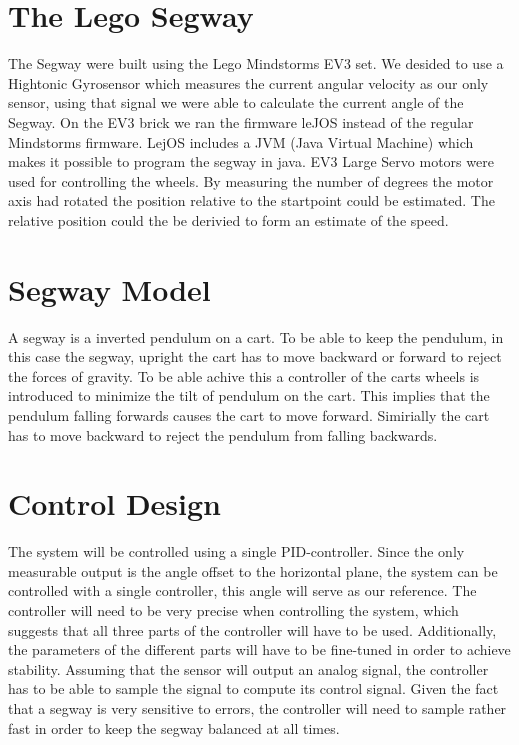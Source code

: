  \section{The Lego Segway}
 The Segway were built using the Lego Mindstorms EV3 set. We desided to use a Hightonic Gyrosensor which measures the current angular velocity as our only sensor, using that signal we were able to calculate the current angle of the Segway. On the EV3 brick we ran the firmware leJOS instead of the regular Mindstorms firmware. LejOS includes a JVM (Java Virtual Machine) which makes it possible to program the segway in java. EV3 Large Servo motors were used for controlling the wheels. By measuring the number of degrees the motor axis had rotated the position relative to the startpoint could be estimated. The relative position could the be derivied to form an estimate of the speed. 

\section{Segway Model}
A segway is a inverted pendulum on a cart. To be able to keep the pendulum, in this case the segway, upright the cart has to move backward or forward to reject the forces of gravity. To be able achive this a controller of the carts wheels is introduced to minimize the tilt of pendulum on the cart. This implies that the pendulum falling forwards causes the cart to move forward. Simirially the cart has to move backward to reject the pendulum from falling backwards. 

\section{Control Design}

The system will be controlled using a single PID-controller. Since the only measurable output is the angle offset to the horizontal plane, the system can be controlled with a single controller, this angle will serve as our reference. The controller will need to be very precise when controlling the system, which suggests that all three parts of the controller will have to be used. Additionally, the parameters of the different parts will have to be fine-tuned in order to achieve stability.
    Assuming that the sensor will output an analog signal, the controller has to be able to sample the signal to compute its control signal. Given the fact that a segway is very sensitive to errors, the controller will need to sample rather fast in order to keep the segway balanced at all times.


